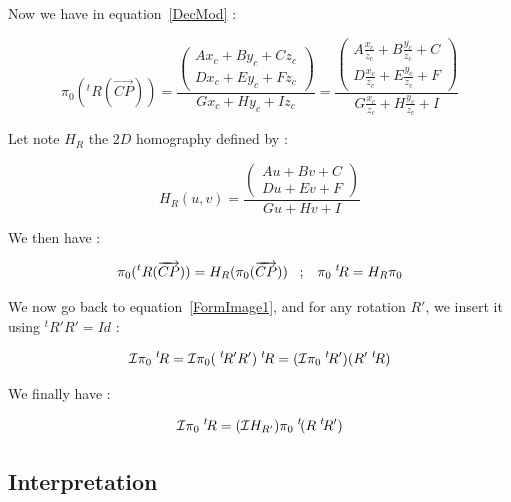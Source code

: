 Now we have in equation~\ref{DecMod} :

\begin{equation}
	\pi_0(^t R(\overrightarrow{CP})) 
	=  \frac{\begin{pmatrix} Ax_c+By_c+Cz_c \\ Dx_c+Ey_c+Fz_c  \end{pmatrix}}{Gx_c+Hy_c+Iz_c}
		=  \frac{\begin{pmatrix} A\frac{x_c}{z_c}+B\frac{y_c}{z_c}+C \\  D\frac{x_c}{z_c}+E\frac{y_c}{z_c}+F  \end{pmatrix}}
			{G\frac{x_c}{z_c}+H\frac{y_c}{z_c}+I}
\end{equation}

Let note $H_R$ the $2D$  homography defined by :

\begin{equation}
 H_R(u,v) =  \frac{\begin{pmatrix} Au+Bv+C \\  Du+Ev+F  \end{pmatrix}} {Gu+Hv+I}
\end{equation}

We then have :

\begin{equation}
	\pi_0(^t R(\overrightarrow{CP}))  = H_R  (\pi_0 (\overrightarrow{CP}))
\;\;\;  ;  \;\;\;
        \pi_0  \; ^{t} \!  R = H_R  \pi_0
\end{equation}

We now go back to equation~\ref{FormImage1}, and for any rotation $R'$, we insert it using $^t R'R'=Id$ :

\begin{equation}
	\mathcal{I} \pi_0   \; ^{t} \! R = \mathcal{I}  \pi_0   (\; ^{t} \! R' R')  \; ^{t} \! R = ( \mathcal{I}  \pi_0   \; ^{t} \! R')  (R' \; ^{t} \! R )
\end{equation}

We finally have :

\begin{equation}
	   \mathcal{I} \pi_0   \; ^{t} \! R 
	   = (\mathcal{I} H_{R'})   \pi_0   \; ^{t} \! (R \; ^{t} \! R')  \label{FormRotCalib}
\end{equation}



\subsection{Interpretation}

